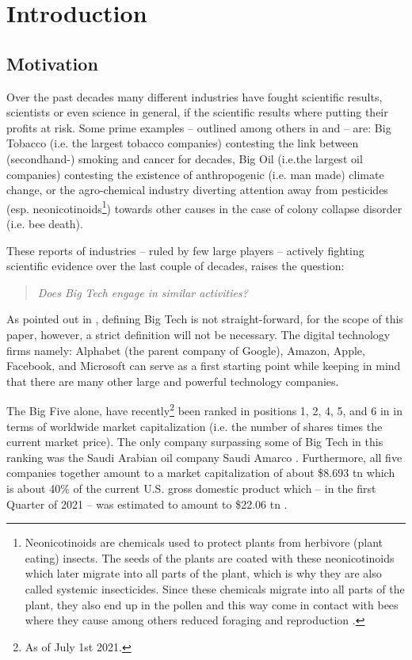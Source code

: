 \section{Introduction}
\label{sec:intro}

\subsection{Motivation}
Over the past decades many different industries have fought scientific results, scientists or even science in general, if the scientific results where putting their profits at risk. 
Some prime examples -- outlined among others in \citet{oreskes_merchants_2010} and \citet{cuveillier_forschung_2020} -- are: 
Big Tobacco (i.e. the largest tobacco companies) contesting the link between (secondhand-) smoking and cancer for decades, 
Big Oil (i.e.the largest oil companies) contesting the existence of anthropogenic (i.e. man made) climate change, 
or the agro-chemical industry diverting attention away from pesticides (esp. neonicotinoids\footnote{Neonicotinoids are chemicals used to protect plants from herbivore (plant eating) insects. The seeds of the plants are coated with these neonicotinoids which later migrate into all parts of the plant, which is why they are also called systemic insecticides. Since these chemicals migrate into all parts of the plant, they also end up in the pollen and this way come in contact with bees where they cause among others reduced foraging and reproduction \citep{whitehorn_neonicotinoid_2012}.}) towards other causes in the case of colony collapse disorder (i.e. bee death).


These reports of industries -- ruled by few large players -- actively fighting scientific evidence over the last couple of decades, raises the question:
\begin{quote}
\itshape
Does Big Tech engage in similar activities?
\end{quote}

As pointed out in \citep{abdalla_grey_2021}, defining Big Tech is not straight-forward, for the scope of this paper, however, a strict definition will not be necessary.
The  digital technology firms namely: Alphabet (the parent company of Google), Amazon, Apple, Facebook, and Microsoft can serve as a first starting point while keeping in mind that there are many other large and powerful technology companies.

The Big Five alone, have recently\footnote{As of July 1st 2021.} been ranked in positions 1, 2, 4, 5, and 6 in in terms of worldwide market capitalization (i.e. the number of shares times the current market price).
The only company surpassing some of Big Tech in this ranking was the Saudi Arabian oil company Saudi Amarco \citep{noauthor_largest_2021}. 
Furthermore, all five companies together amount to a market capitalization of about \$8.693 \gls{tn} which is about 40\% of the current U.S. gross domestic product which -- in the first Quarter of 2021 -- was estimated to amount to \$22.06 \gls{tn} \citep{bea_gross_2021}.

